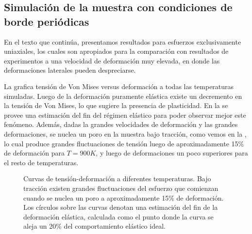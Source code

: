 \subsection{Simulación de la muestra con condiciones de borde periódicas}
\label{S3_3_1}

En el texto que continúa, presentamos resultados para esfuerzos exclusivamente uniaxiales, los cuales son apropiados para la comparación con resultados de experimentos a una velocidad de deformación muy elevada, en donde las deformaciones laterales pueden despreciarse. 

La  grafica tensión de Von Mises versus deformación a todas las temperaturas simuladas. Luego de la deformación puramente elástica existe un decremento en la tensión de Von Mises, lo que sugiere la presencia de plasticidad. En la  se provee una estimación del fin del régimen elástico para poder observar mejor este fenómeno. Además, dadas la grandes velocidades de deformación y las grandes deformaciones, se nuclea un poro en la muestra bajo tracción, como vemos en la , lo cual produce grandes fluctuaciones de tensión luego de aproximadamente 15\% de deformación para $T=900K$, y luego de deformaciones un poco superiores para el resto de temperaturas.


\begin{figure}[htp]
\centering
{}
\caption[Curvas de tensión-deformación a diferentes temperaturas]{Curvas de tensión-deformación a diferentes temperaturas. Bajo tracción existen grandes fluctuaciones del esfuerzo que comienzan cuando se nuclea un poro a aproximadamente 15\% de deformación. Los círculos sobre las curvas denotan una estimación del fin de la deformación elástica, calculada como el punto donde la curva se aleja un 20\% del comportamiento elástico ideal.}
\label{C3:fg:sStrain}
\end{figure}

